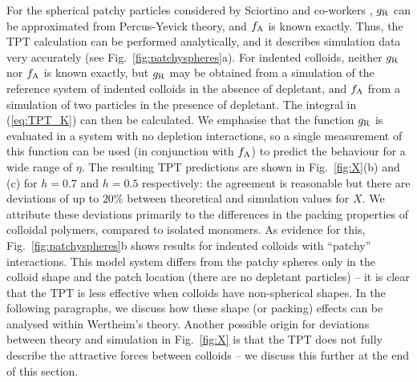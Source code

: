 \documentclass[8.5pt,oneside,onecolumn]{article}
\begin{document}
For the spherical patchy particles considered by Sciortino and
co-workers \cite{Sciortino2007}, $g_{\rm R}$ can be approximated from
Percus-Yevick theory, and $f_{\rm A}$ is known exactly.  
Thus, the
TPT calculation can be performed analytically, and
it describes simulation data very accurately (see Fig.~\ref{fig:patchyspheres}a).
%
For indented colloids, neither $g_{\rm R}$ nor $f_{\rm A}$ is known
exactly, but $g_{\rm R}$ may be obtained from a simulation of
the reference system of indented colloids in the absence of depletant,
and $f_{\rm A}$ from a simulation of two particles in the presence of
depletant.  The integral in (\ref{eq:TPT_K}) can then be
calculated. 
%
We emphasise that the function $g_{\rm R}$ is evaluated in a system with no depletion interactions, so a single 
measurement of this function can be used (in conjunction with $f_{\rm A}$) to predict the behaviour for a wide range of $\eta$.
%
The resulting TPT predictions are shown in
Fig.~\ref{fig:X}(b) and (c) for $h=0.7$ and $h=0.5$ respectively: the agreement is reasonable but there are
deviations of up to $20\%$ between theoretical and simulation values for $X$.  
%
We attribute these deviations primarily to the differences in the packing properties 
of colloidal polymers, compared to isolated monomers.  As evidence for this, Fig.~\ref{fig:patchyspheres}b shows
results for indented colloids with ``patchy'' interactions.  This model system
differs from the patchy spheres only in the colloid shape and the patch location (there are no depletant particles)
-- it is clear that the TPT is less effective when colloids have non-spherical shapes. 
In the following paragraphs, we discuss how these shape (or packing) effects can be analysed within Wertheim's theory.  
 Another possible origin for deviations between theory and simulation 
in Fig.~\ref{fig:X} 
is that the TPT does not fully describe the attractive forces between colloids -- we discuss
this further at the end of this section.


\end{document}
